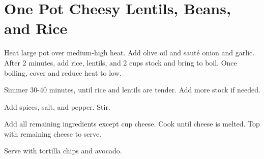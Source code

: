 \section[One Pot Cheesy Lentils]{One Pot Cheesy Lentils, Beans, and Rice}
\begin{recipe}



	Heat large pot over medium-high heat. Add olive oil and saut\'{e} onion and garlic. After 2 minutes, add rice, lentils, and 2 cups stock and bring to boil. Once boiling, cover and reduce heat to low.

	Simmer 30-40 minutes, until rice and lentils are tender. Add more stock if needed.

	Add spices, salt, and pepper. Stir.

	Add all remaining ingredients except  cup cheese. Cook until cheese is melted. Top with remaining cheese to serve.

	Serve with tortilla chips and avocado.

\end{recipe}
